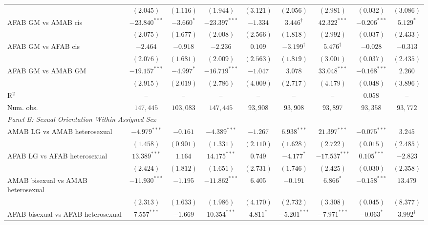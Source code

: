 \begin{table}[htpb!]
{\begin{tabular}{l c c c c c c c c}
 & $(2.045)$ & $(1.116)$ & $(1.944)$ & $(3.121)$ & $(2.056)$ & $(2.981)$ & $(0.032)$ & $(3.086)$ \\
AFAB GM vs AMAB cis & $-23.840^{***}$ & $-3.660^{*}$ & $-23.397^{***}$ & $-1.334$ & $3.446^{\dagger}$ & $42.322^{***}$ & $-0.206^{***}$ & $5.129^{*}$ \\
 & $(2.075)$ & $(1.677)$ & $(2.008)$ & $(2.566)$ & $(1.818)$ & $(2.992)$ & $(0.037)$ & $(2.433)$ \\
AFAB GM vs AFAB cis & $-2.464$ & $-0.918$ & $-2.236$ & $0.109$ & $-3.199^{\dagger}$ & $5.476^{\dagger}$ & $-0.028$ & $-0.313$ \\
 & $(2.076)$ & $(1.681)$ & $(2.009)$ & $(2.563)$ & $(1.819)$ & $(3.001)$ & $(0.037)$ & $(2.435)$ \\
AFAB GM vs AMAB GM & $-19.157^{***}$ & $-4.997^{*}$ & $-16.719^{***}$ & $-1.047$ & $3.078$ & $33.048^{***}$ & $-0.168^{***}$ & $2.260$ \\
 & $(2.915)$ & $(2.019)$ & $(2.786)$ & $(4.009)$ & $(2.717)$ & $(4.179)$ & $(0.048)$ & $(3.896)$ \\
\hline
R$^2$ & -- & -- & -- & -- & -- & -- & $0.058$ & -- \\
Num. obs. & $147,445$ & $103,083$ & $147,445$ & $93,908$ & $93,908$ & $93,897$ & $93,358$ & $93,772$ \\
\hline
\multicolumn{9}{l}{\textit{Panel B: Sexual Orientation Within Assigned Sex}} \\
AMAB LG vs AMAB heterosexual & $-4.979^{***}$ & $-0.161$ & $-4.389^{***}$ & $-1.267$ & $6.938^{***}$ & $21.397^{***}$ & $-0.075^{***}$ & $3.245$ \\
 & $(1.458)$ & $(0.901)$ & $(1.331)$ & $(2.110)$ & $(1.628)$ & $(2.722)$ & $(0.015)$ & $(2.485)$ \\
AFAB LG vs AFAB heterosexual & $13.389^{***}$ & $1.164$ & $14.175^{***}$ & $0.749$ & $-4.177^{*}$ & $-17.537^{***}$ & $0.105^{***}$ & $-2.823$ \\
 & $(2.424)$ & $(1.812)$ & $(1.651)$ & $(2.731)$ & $(1.746)$ & $(2.425)$ & $(0.030)$ & $(2.358)$ \\
AMAB bisexual vs AMAB heterosexual & $-11.930^{***}$ & $-1.195$ & $-11.862^{***}$ & $6.405$ & $-0.191$ & $6.866^{*}$ & $-0.158^{***}$ & $13.479$ \\
 & $(2.313)$ & $(1.633)$ & $(1.986)$ & $(4.170)$ & $(2.732)$ & $(3.308)$ & $(0.045)$ & $(8.377)$ \\
AFAB bisexual vs AFAB heterosexual & $7.557^{***}$ & $-1.669$ & $10.354^{***}$ & $4.811^{*}$ & $-5.201^{***}$ & $-7.971^{***}$ & $-0.063^{*}$ & $3.992^{\dagger}$ \\

\end{tabular}}
\end{table}
